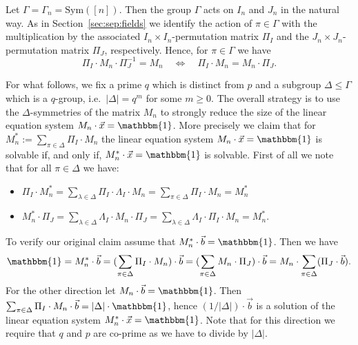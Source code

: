 \documentclass[a4paper,UKenglish]{lipics}
\newcommand{\defeq}{:=}
\newcommand{\inseg}[1]{\ensuremath{[#1]}}
\newcommand{\card}[1]{\ensuremath{|#1|}}
\newcommand{\Sym}{\ensuremath{\text{Sym}}\xspace}
\newcommand{\onevec}{\ensuremath{\mathbbm{1}}}
\theoremstyle{plain}
\begin{document}
Let $\Gamma = \Gamma_n = \Sym(\inseg{n})$. Then the group $\Gamma$ acts on $I_n$
and $J_n$ in the natural way. 
As in Section~\ref{sec:sep:fields} we identify the action of $\pi \in 
\Gamma$ with the multiplication by the associated $I_n \times 
I_n$-permutation matrix $\Pi_I$ and the $J_n \times J_n$-permutation 
matrix $\Pi_J$, respectively. Hence, for $\pi \in \Gamma$ we have 
\[ \Pi_I \cdot M_n \cdot \Pi_J^{-1} = M_n \quad\Leftrightarrow\quad 
\Pi_I \cdot M_n = M_n \cdot \Pi_J. \]

For what follows, we fix a prime $q$ which is distinct from $p$ 
and a subgroup $\Delta 
\leq \Gamma$ which is a $q$-group, i.e.\ $\card \Delta = q^m$ for some $m 
\geq 0$. The overall strategy is to use the $\Delta$-symmetries of the 
matrix $M_n$
to strongly reduce the size of the linear equation system $M_n \cdot \vec x =
\onevec$.
More precisely we claim that for $M_n^* \defeq \sum_{\pi \in \Delta} \Pi_I
\cdot M_n$ the
linear equation system $M_n \cdot \vec x = \onevec$ is solvable if, and only if,
$M_n^*\cdot \vec x = \onevec$ is solvable. First of all we note that for all
$\pi \in \Delta$ we have:
\begin{itemize}
 \item $\Pi_I \cdot M_n^* = \sum_{\lambda \in \Delta} \Pi_I \cdot \Lambda_I
\cdot M_n = \sum_{\pi \in \Delta} \Pi_I \cdot M_n = M_n^*$
 \item $M_n^* \cdot \Pi_J = 
 \sum_{\lambda \in \Delta} \Lambda_I \cdot M_n \cdot \Pi_J = 
 \sum_{\lambda \in \Delta} \Lambda_I \cdot \Pi_I \cdot M_n = M_n^*$.
\end{itemize}
To verify our original claim assume that $M_n^* \cdot \vec b =
\onevec$. Then we have
\[ \onevec = M_n^* \cdot \vec b = (\sum_{\pi \in \Delta} \Pi_I \cdot M_n)
\cdot \vec b = 
(\sum_{\pi \in \Delta} M_n \cdot \Pi_J) \cdot \vec b =
M_n \cdot \sum_{\pi \in \Delta} (\Pi_J \cdot \vec b). \]
For the other direction let $M_n \cdot \vec b = \onevec$. Then
$\sum_{\pi \in \Delta} \Pi_I \cdot M_n \cdot \vec b = \card{\Delta} \cdot
\onevec$, hence $(1 / \card{\Delta}) \cdot \vec b$ is a solution of the
linear equation system $M_n^* \cdot \vec x = \onevec$. Note that for this 
direction we require that $q$ and $p$ are co-prime as we have to divide by 
$\card \Delta$.
\end{document}
